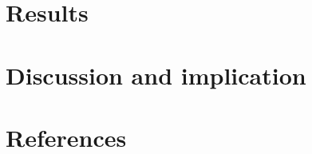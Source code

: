 \documentclass[
  man]{apa6}
\begin{document}
\hypertarget{results}{%
\section{Results}\label{results}}

\hypertarget{discussion-and-implication}{%
\section{Discussion and implication}\label{discussion-and-implication}}

\newpage

\hypertarget{references}{%
\section{References}\label{references}}
\end{document}
